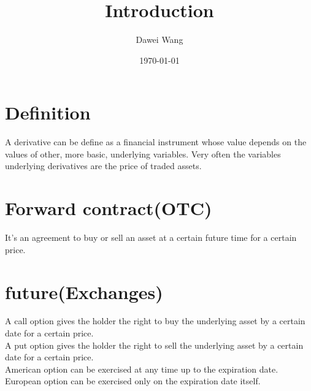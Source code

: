 \documentclass{article}
\title{Introduction}
\author{Dawei Wang}
\date{\today}
\begin{document}
	\maketitle
\section{Definition}
A derivative can be define as a financial instrument whose value depends on the values of other, more basic, underlying  variables. Very often the variables underlying derivatives are the price of traded assets.

\section{Forward contract(OTC)}
It's an agreement to buy or sell an asset at a certain future time for a certain price.

\section{future(Exchanges)}
A call option gives the holder the right to buy the underlying asset by a certain date for a certain price.
\\
A put option gives the holder the right to sell the underlying asset by a certain date for a certain price.
\\
American option can be exercised at any time up to the expiration date.
European option can be exercised only on the expiration date itself.
\end{document}
